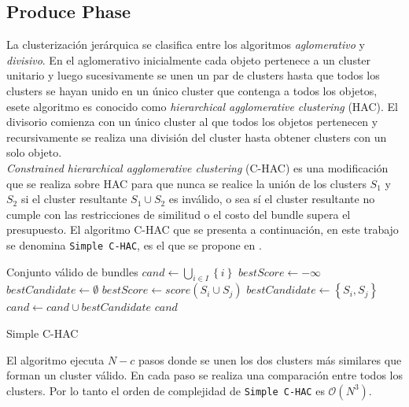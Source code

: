 \subsection{Produce Phase}
La clusterización jerárquica se clasifica entre los algoritmos \textit{aglomerativo} y \textit{divisivo}. En el aglomerativo inicialmente cada objeto pertenece a un cluster unitario y luego sucesivamente se unen un par de clusters hasta que todos los clusters se hayan unido en un único cluster que contenga a todos los objetos, esete algoritmo es conocido como \textit{hierarchical agglomerative clustering} (HAC). El divisorio comienza con un único cluster al que todos los objetos pertenecen y recursivamente se realiza una división del cluster hasta obtener clusters con un solo objeto.\\
\textit{Constrained hierarchical agglomerative clustering} (C-HAC) es una modificación que se realiza sobre HAC para que nunca se realice la unión de los clusters $S_1$ y $S_2$ si el cluster resultante $S_1 \cup S_2$ es inválido, o sea sí el cluster resultante no cumple con las restricciones de similitud o el costo del bundle supera el presupuesto. El algoritmo C-HAC que se presenta a continuación, en este trabajo se denomina \texttt{Simple C-HAC}, es el que se propone en \cite{compositeRetrival}.\\

\begin{algorithm}[H]
\begin{algorithmic}[1]
\ENSURE Conjunto válido de bundles
\STATE $cand \leftarrow \bigcup_{i \in I}\left\{i\right\}$
	\STATE $bestScore \leftarrow -\infty$
	\STATE $bestCandidate \leftarrow \emptyset$
			 \label{validMerge}
				 \label{score}
					\STATE $bestScore \leftarrow score(S_i \cup  S_j)$
					\STATE $bestCandidate \leftarrow \left\{S_i,S_j\right\}$
				\ENDIF
			\ENDIF
		\ENDFOR
	\ENDFOR
		\BREAK
	\ENDIF
	\STATE $cand \leftarrow cand \cup bestCandidate $
\ENDWHILE
\RETURN $cand$
\end{algorithmic}
\caption{Simple C-HAC}\label{alg:SimpleC-HAC}
\end{algorithm}

El algoritmo ejecuta $N - c$ pasos donde se unen los dos clusters más similares que forman un cluster válido. En cada paso se realiza una comparación entre todos los clusters. Por lo tanto el orden de complejidad de \texttt{Simple C-HAC} es $\mathcal{O}(N^{3})$.\\

